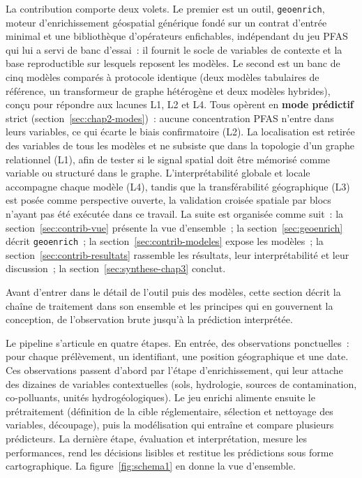 La contribution comporte deux volets. Le premier est un outil, \texttt{geoenrich}, moteur d'enrichissement g\'eospatial g\'en\'erique fond\'e sur un contrat d'entr\'ee minimal et une biblioth\`eque d'op\'erateurs enfichables, ind\'ependant du jeu PFAS qui lui a servi de banc d'essai~: il fournit le socle de variables de contexte et la base reproductible sur lesquels reposent les mod\`eles. Le second est un banc de cinq mod\`eles compar\'es \`a protocole identique (deux mod\`eles tabulaires de r\'ef\'erence, un transformeur de graphe h\'et\'erog\`ene et deux mod\`eles hybrides), con\c{c}u pour r\'epondre aux lacunes L1, L2 et L4. Tous op\`erent en \textbf{mode pr\'edictif} strict (section~\ref{sec:chap2-modes})~: aucune concentration PFAS n'entre dans leurs variables, ce qui \'ecarte le biais confirmatoire (L2). La localisation est retir\'ee des variables de tous les mod\`eles et ne subsiste que dans la topologie d'un graphe relationnel (L1), afin de tester si le signal spatial doit \^etre m\'emoris\'e comme variable ou structur\'e dans le graphe. L'interpr\'etabilit\'e globale et locale accompagne chaque mod\`ele (L4), tandis que la transf\'erabilit\'e g\'eographique (L3) est pos\'ee comme perspective ouverte, la validation crois\'ee spatiale par blocs n'ayant pas \'et\'e ex\'ecut\'ee dans ce travail. La suite est organis\'ee comme suit~: la section~\ref{sec:contrib-vue} pr\'esente la vue d'ensemble~; la section~\ref{sec:geoenrich} d\'ecrit \texttt{geoenrich}~; la section~\ref{sec:contrib-modeles} expose les mod\`eles~; la section~\ref{sec:contrib-resultats} rassemble les r\'esultats, leur interpr\'etabilit\'e et leur discussion~; la section~\ref{sec:synthese-chap3} conclut.


\label{sec:contrib-vue}

Avant d'entrer dans le d\'etail de l'outil puis des mod\`eles, cette section d\'ecrit la cha\^ine de traitement dans son ensemble et les principes qui en gouvernent la conception, de l'observation brute jusqu'\`a la pr\'ediction interpr\'et\'ee.

\label{sec:contrib-chaine}

Le pipeline s'articule en quatre \'etapes. En entr\'ee, des observations ponctuelles~: pour chaque pr\'el\`evement, un identifiant, une position g\'eographique et une date. Ces observations passent d'abord par l'\'etape d'enrichissement, qui leur attache des dizaines de variables contextuelles (sols, hydrologie, sources de contamination, co-polluants, unit\'es hydrog\'eologiques). Le jeu enrichi alimente ensuite le pr\'etraitement (d\'efinition de la cible r\'eglementaire, s\'election et nettoyage des variables, d\'ecoupage), puis la mod\'elisation qui entra\^ine et compare plusieurs pr\'edicteurs. La derni\`ere \'etape, \'evaluation et interpr\'etation, mesure les performances, rend les d\'ecisions lisibles et restitue les pr\'edictions sous forme cartographique. La figure~\ref{fig:schema1} en donne la vue d'ensemble.

